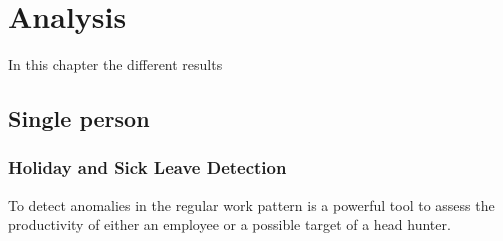 \chapter{Analysis}\label{analysis}
In this chapter the different results


\section{Single person}


\subsection{Holiday and Sick Leave Detection}
To detect anomalies in the regular work pattern is a powerful tool to assess the productivity of either an employee or a possible target of a head hunter.

